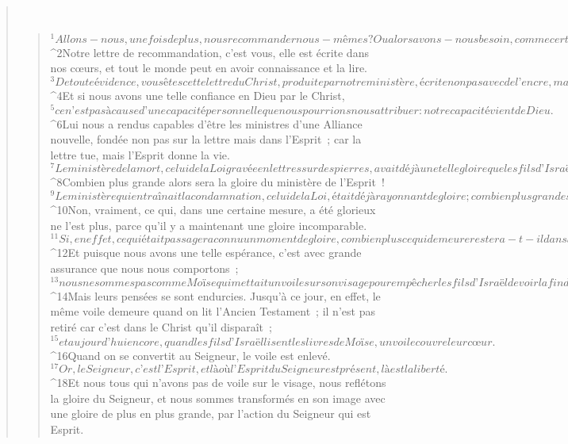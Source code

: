 \begin{verse}
         
      \bchapter{}
      \begin{verse}
${}^{1}Allons-nous, une fois de plus, nous recommander nous-mêmes ? Ou alors avons-nous besoin, comme certains, de lettres de recommandation qu’il faudrait vous présenter, ou obtenir de vous ? 
${}^{2}Notre lettre de recommandation, c’est vous, elle est écrite dans nos cœurs, et tout le monde peut en avoir connaissance et la lire. 
${}^{3}De toute évidence, vous êtes cette lettre du Christ, produite par notre ministère, écrite non pas avec de l’encre, mais avec l’Esprit du Dieu vivant, non pas, comme la Loi, sur des tables de pierre, mais sur des tables de chair, sur vos cœurs.
${}^{4}Et si nous avons une telle confiance en Dieu par le Christ, 
${}^{5}ce n’est pas à cause d’une capacité personnelle que nous pourrions nous attribuer : notre capacité vient de Dieu. 
${}^{6}Lui nous a rendus capables d’être les ministres d’une Alliance nouvelle, fondée non pas sur la lettre mais dans l’Esprit ; car la lettre tue, mais l’Esprit donne la vie. 
${}^{7}Le ministère de la mort, celui de la Loi gravée en lettres sur des pierres, avait déjà une telle gloire que les fils d’Israël ne pouvaient pas fixer le visage de Moïse à cause de la gloire, pourtant passagère, qui rayonnait de son visage. 
${}^{8}Combien plus grande alors sera la gloire du ministère de l’Esprit ! 
${}^{9}Le ministère qui entraînait la condamnation, celui de la Loi, était déjà rayonnant de gloire ; combien plus grande sera la gloire du ministère qui fait de nous des justes ! 
${}^{10}Non, vraiment, ce qui, dans une certaine mesure, a été glorieux ne l’est plus, parce qu’il y a maintenant une gloire incomparable. 
${}^{11}Si, en effet, ce qui était passager a connu un moment de gloire, combien plus ce qui demeure restera-t-il dans la gloire !
${}^{12}Et puisque nous avons une telle espérance, c’est avec grande assurance que nous nous comportons ; 
${}^{13}nous ne sommes pas comme Moïse qui mettait un voile sur son visage pour empêcher les fils d’Israël de voir la fin de ce rayonnement passager. 
${}^{14}Mais leurs pensées se sont endurcies. Jusqu’à ce jour, en effet, le même voile demeure quand on lit l’Ancien Testament ; il n’est pas retiré car c’est dans le Christ qu’il disparaît ; 
${}^{15}et aujourd’hui encore, quand les fils d’Israël lisent les livres de Moïse, un voile couvre leur cœur. 
${}^{16}Quand on se convertit au Seigneur, le voile est enlevé. 
${}^{17}Or, le Seigneur, c’est l’Esprit, et là où l’Esprit du Seigneur est présent, là est la liberté. 
${}^{18}Et nous tous qui n’avons pas de voile sur le visage, nous reflétons la gloire du Seigneur, et nous sommes transformés en son image avec une gloire de plus en plus grande, par l’action du Seigneur qui est Esprit.
      

\end{verse}
\end{verse}
